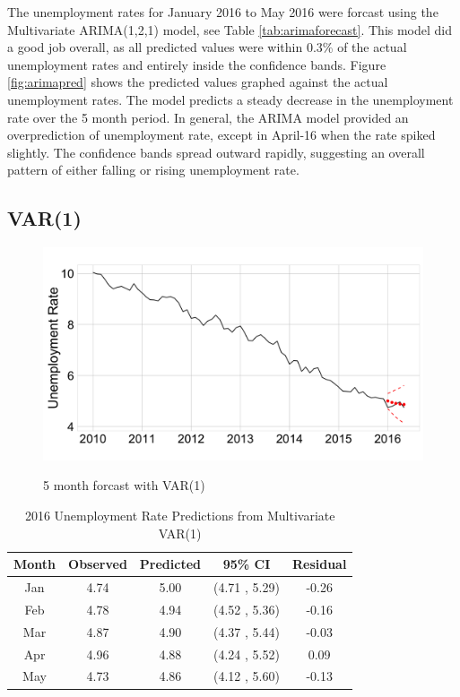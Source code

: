 \documentclass[twoside,twocolumn]{article}
\begin{document}
The unemployment rates for January 2016 to May 2016 were forcast using the Multivariate ARIMA(1,2,1) model, see Table \ref{tab:arimaforecast}.  This model did a good job overall, as all predicted values were within 0.3\% of the actual unemployment rates and entirely inside the confidence bands.  Figure \ref{fig:arimapred} shows the predicted values graphed against the actual unemployment rates. The model predicts a steady decrease in the unemployment rate over the 5 month period.  In general, the ARIMA model provided an overprediction of unemployment rate, except in April-16 when the rate spiked slightly. The confidence bands spread outward rapidly, suggesting an overall pattern of either falling or rising unemployment rate.

\subsection{VAR(1)}

   \begin{figure}[htb]
    	\centering
     	\caption{5 month forcast with VAR(1)}
     	\includegraphics[width=\linewidth]{images/varpred}
     	\label{fig:varpred}
 \end{figure}
 
\begin{table}[ht]
\centering
\small
\caption{2016 Unemployment Rate Predictions from Multivariate VAR(1)}
\label{tab:varforecast}
\begin{tabular}{ccccc}
  \hline
Month & Observed & Predicted& 95\% CI  & Residual \\ 
  \hline
Jan  & 4.74 & 5.00 & (4.71 , 5.29) & -0.26 \\ 
Feb & 4.78 & 4.94 & (4.52 , 5.36) & -0.16 \\ 
Mar  & 4.87 & 4.90 & (4.37 , 5.44) & -0.03 \\ 
Apr & 4.96 & 4.88 & (4.24 , 5.52) & 0.09 \\ 
May & 4.73 & 4.86 & (4.12 , 5.60) & -0.13 \\ 
   \hline
\end{tabular}
\end{table}
\end{document}
